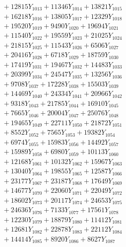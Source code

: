 \documentclass[a4paper,10pt]{article}
\begin{document}
{\begin{align}
&\;  + 12815 Y_{1013} + 11346 Y_{1014} + 13821 Y_{1015} \\[0.3ex]
&\;  + 16218 Y_{1016} + 13805 Y_{1017} + 12329 Y_{1018} \\[0.5ex]\allowbreak
&\;  + 19520 Y_{1019} + 9490 Y_{1020} + 19694 Y_{1021} \\[0.3ex]
&\;  + 11540 Y_{1022} + 19559 Y_{1023} + 21025 Y_{1024} \\[0.3ex]
&\;  + 21815 Y_{1025} + 11543 Y_{1026} + 6506 Y_{1027} \\[0.3ex]
&\;  + 20416 Y_{1028} + 6718 Y_{1029} + 18759 Y_{1030} \\[0.3ex]
&\;  + 17419 Y_{1031} + 19467 Y_{1032} + 14483 Y_{1033} \\[0.3ex]
&\;  + 20399 Y_{1034} + 24547 Y_{1035} + 13256 Y_{1036} \\[0.3ex]
&\;  + 9708 Y_{1037} + 17228 Y_{1038} + 15503 Y_{1039} \\[0.3ex]
&\;  + 14469 Y_{1040} + 24334 Y_{1041} + 20966 Y_{1042} \\[0.3ex]
&\;  + 9318 Y_{1043} + 21785 Y_{1044} + 16910 Y_{1045} \\[0.3ex]
&\;  + 7665 Y_{1046} + 20004 Y_{1047} + 25076 Y_{1048} \\[0.5ex]\allowbreak
&\;  + 19465 Y_{1049} + 22711 Y_{1050} + 21872 Y_{1051} \\[0.3ex]
&\;  + 8552 Y_{1052} + 7565 Y_{1053} + 19382 Y_{1054} \\[0.3ex]
&\;  + 6974 Y_{1055} + 15983 Y_{1056} + 14492 Y_{1057} \\[0.3ex]
&\;  + 15989 Y_{1058} + 6980 Y_{1059} + 10113 Y_{1060} \\[0.3ex]
&\;  + 12168 Y_{1061} + 10132 Y_{1062} + 15967 Y_{1063} \\[0.3ex]
&\;  + 13040 Y_{1064} + 19855 Y_{1065} + 12587 Y_{1066} \\[0.3ex]
&\;  + 23177 Y_{1067} + 23187 Y_{1068} + 17649 Y_{1069} \\[0.3ex]
&\;  + 14677 Y_{1070} + 22060 Y_{1071} + 22049 Y_{1072} \\[0.3ex]
&\;  + 18602 Y_{1073} + 20117 Y_{1074} + 24653 Y_{1075} \\[0.3ex]
&\;  + 24636 Y_{1076} + 7133 Y_{1077} + 17561 Y_{1078} \\[0.5ex]\allowbreak
&\;  + 12230 Y_{1079} + 18879 Y_{1080} + 11412 Y_{1081} \\[0.3ex]
&\;  + 12681 Y_{1082} + 22878 Y_{1083} + 22112 Y_{1084} \\[0.3ex]
&\;  + 14414 Y_{1085} + 8920 Y_{1086} + 8627 Y_{1087} \\[0.3ex]

\end{align}}
\end{document}
